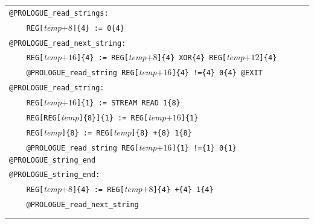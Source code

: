 \documentclass[10pt,twocolumn]{article}
\begin{document}
\begin{table}[!h]
\vspace{-0.5cm}
\begin{center}
\def\arraystretch{1}
\begin{tabular}{l}

\texttt{@PROLOGUE\_read\_strings:}\\ %
\texttt{~~~~REG[}\textit{temp}$ +8 $\texttt{]\{4\} := 0\{4\}}\\ %
\texttt{@PROLOGUE\_read\_next\_string:}\\ %
\texttt{~~~~REG[}\textit{temp}$ +16 $\texttt{]\{4\} := REG[}\textit{temp}$ +8
$\texttt{]\{4\} XOR\{4\} REG[}\textit{temp}$ +12 $\texttt{]\{4\}}\\ %
\texttt{~~~~@PROLOGUE\_read\_string REG[}\textit{temp}$ +16 $\texttt{]\{4\}
!=\{4\} 0\{4\} @EXIT}\\ %
\texttt{@PROLOGUE\_read\_string:}\\ %
\texttt{~~~~REG[}\textit{temp}$ +16 $\texttt{]\{1\} := STREAM READ 1\{8\}}\\ %
\texttt{~~~~REG[REG[}\textit{temp}\texttt{]\{8\}]\{1\} := REG[}\textit{temp}$
+16 $\texttt{]\{1\}}\\ %
\texttt{~~~~REG[}\textit{temp}\texttt{]\{8\} := REG[}\textit{temp}\texttt{]\{8\}
+\{8\} 1\{8\}}\\ %
\texttt{~~~~@PROLOGUE\_read\_string REG[}\textit{temp}$ +16 $\texttt{]\{1\}
!=\{1\} 0\{1\} @PROLOGUE\_string\_end}\\ %
\texttt{@PROLOGUE\_string\_end:}\\ %
\texttt{~~~~REG[}\textit{temp}$ +8 $\texttt{]\{4\} := REG[}\textit{temp}$ +8
$\texttt{]\{4\} +\{4\} 1\{4\}}\\ %
\texttt{~~~~@PROLOGUE\_read\_next\_string}\\ %
\\ \\



\end{tabular}
\end{center}
\end{table}
\end{document}
